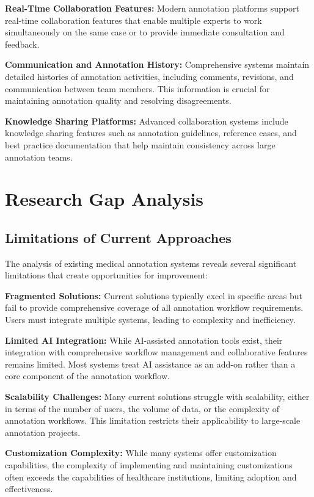 \textbf{Real-Time Collaboration Features:} Modern annotation platforms support real-time collaboration features that enable multiple experts to work simultaneously on the same case or to provide immediate consultation and feedback.

\textbf{Communication and Annotation History:} Comprehensive systems maintain detailed histories of annotation activities, including comments, revisions, and communication between team members. This information is crucial for maintaining annotation quality and resolving disagreements.

\textbf{Knowledge Sharing Platforms:} Advanced collaboration systems include knowledge sharing features such as annotation guidelines, reference cases, and best practice documentation that help maintain consistency across large annotation teams.

\section{Research Gap Analysis}

\subsection{Limitations of Current Approaches}

The analysis of existing medical annotation systems reveals several significant limitations that create opportunities for improvement:

\textbf{Fragmented Solutions:} Current solutions typically excel in specific areas but fail to provide comprehensive coverage of all annotation workflow requirements. Users must integrate multiple systems, leading to complexity and inefficiency.

\textbf{Limited AI Integration:} While AI-assisted annotation tools exist, their integration with comprehensive workflow management and collaborative features remains limited. Most systems treat AI assistance as an add-on rather than a core component of the annotation workflow.

\textbf{Scalability Challenges:} Many current solutions struggle with scalability, either in terms of the number of users, the volume of data, or the complexity of annotation workflows. This limitation restricts their applicability to large-scale annotation projects.

\textbf{Customization Complexity:} While many systems offer customization capabilities, the complexity of implementing and maintaining customizations often exceeds the capabilities of healthcare institutions, limiting adoption and effectiveness.

